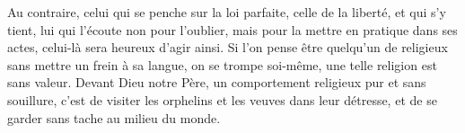 Au contraire, celui qui se penche sur la loi parfaite, celle de la liberté,
		et qui s’y tient,
	lui qui l’écoute non pour l’oublier, mais pour la mettre en pratique dans ses actes,
	celui-là sera heureux d’agir ainsi.
Si l’on pense être quelqu’un de religieux sans mettre un frein à sa langue,
	on se trompe soi-même, une telle religion est sans valeur.
Devant Dieu notre Père, un comportement religieux pur et sans souillure,
	c’est de visiter les orphelins et les veuves dans leur détresse,
	et de se garder sans tache au milieu du monde.

